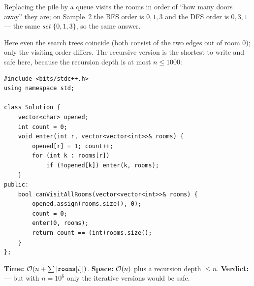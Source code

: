 \begin{alternativebox}
Replacing the pile by a queue visits the rooms in order of ``how many doors away'' they are; on Sample~2 the BFS order is $0, 1, 3$ and the DFS order is $0, 3, 1$ --- the same \emph{set} $\{0,1,3\}$, so the same answer.

\begin{center}
\end{center}
Here even the search trees coincide (both consist of the two edges out of room 0); only the visiting order differs. The recursive version is the shortest to write and safe here, because the recursion depth is at most $n \le 1000$:

\begin{lstlisting}[style=cpp]
#include <bits/stdc++.h>
using namespace std;

class Solution {
    vector<char> opened;
    int count = 0;
    void enter(int r, vector<vector<int>>& rooms) {
        opened[r] = 1; count++;
        for (int k : rooms[r])
            if (!opened[k]) enter(k, rooms);
    }
public:
    bool canVisitAllRooms(vector<vector<int>>& rooms) {
        opened.assign(rooms.size(), 0);
        count = 0;
        enter(0, rooms);
        return count == (int)rooms.size();
    }
};
\end{lstlisting}
\begin{complexitybox}
\textbf{Time:} $\mathcal{O}(n + \sum|\texttt{rooms}[i]|)$. \textbf{Space:} $\mathcal{O}(n)$ plus a recursion depth $\le n$. \textbf{Verdict:} \ac{} --- but with $n = 10^6$ only the iterative versions would be safe.
\end{complexitybox}
\end{alternativebox}

